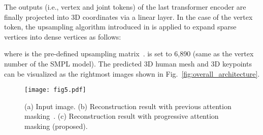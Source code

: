 \documentclass[10pt,twocolumn,letterpaper]{article}
\begin{document}
The outputs (i.e., vertex and joint tokens) of the last transformer encoder are finally projected into 3D coordinates via a linear layer. In the case of the vertex token, the upsampling algorithm introduced in \cite{ranjan18} is applied to expand sparse vertices  into dense vertices  as follows:

where  is the pre-defined upsampling matrix~\cite{ranjan18}.  is set to 6,890 (same as the vertex number of the SMPL model). 
The predicted 3D human mesh and 3D keypoints can be visualized as the rightmost images shown in Fig.~\ref{fig:overall_architecture}.

\begin{figure}
\centering

\centerline{\texttt{[image: fig5.pdf]}}
\vspace{-2.3mm}
\caption{\label{fig:vertex_connection_masking}(a) Input image. (b) Reconstruction result with previous attention masking~\cite{Cho22}. (c) Reconstruction result with progressive attention masking (proposed).}
\vspace{-1mm}
\end{figure}
\end{document}

